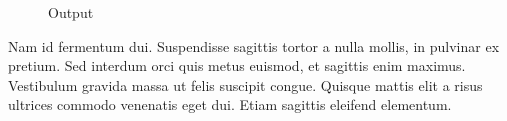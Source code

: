 \documentclass[sigconf]{acmart}
\begin{document}
\begin{figure}[h]
	\centering
	\caption{Output}
\end{figure}

Nam id fermentum dui. Suspendisse sagittis tortor a nulla mollis, in
pulvinar ex pretium. Sed interdum orci quis metus euismod, et sagittis
enim maximus. Vestibulum gravida massa ut felis suscipit
congue. Quisque mattis elit a risus ultrices commodo venenatis eget
dui. Etiam sagittis eleifend elementum.
\end{document}

